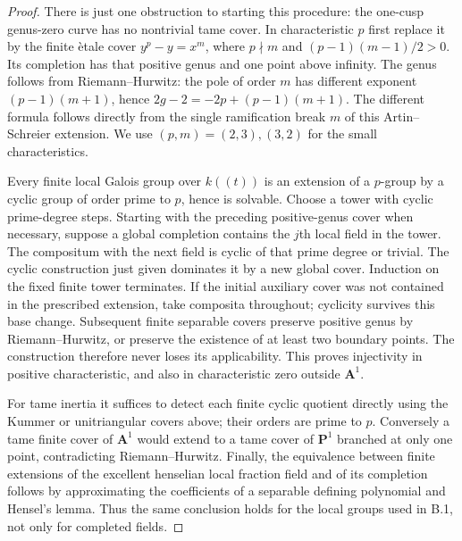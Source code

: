 \begin{proof}
There is just one obstruction to starting this procedure:
the one-cusp genus-zero curve has no nontrivial tame cover. In
characteristic $p$ first replace it by the finite \`etale cover
$y^p-y=x^m$, where $p\nmid m$ and
$(p-1)(m-1)/2>0$. Its completion has that positive genus and one
point above infinity. The genus follows from Riemann--Hurwitz:
the pole of order $m$ has different exponent $(p-1)(m+1)$, hence
$2g-2=-2p+(p-1)(m+1)$. The different formula follows directly
from the single ramification break $m$ of this Artin--Schreier
extension. We use $(p,m)=(2,3),(3,2)$ for the small characteristics.

Every finite local Galois group over $k((t))$ is an extension of
a $p$-group by a cyclic group of order prime to $p$, hence is
solvable. Choose a tower with cyclic prime-degree steps. Starting
with the preceding positive-genus cover when necessary, suppose
a global completion contains the $j$th local field in the tower.
The compositum with the next field is cyclic of that prime degree
or trivial. The cyclic construction just given dominates it by a
new global cover. Induction on the fixed finite tower terminates.
If the initial auxiliary cover was not contained in the prescribed
extension, take composita throughout; cyclicity survives this base
change. Subsequent finite separable covers preserve positive genus
by Riemann--Hurwitz, or preserve the existence of at least two
boundary points. The construction therefore never loses its
applicability. This proves injectivity in positive characteristic,
and also in characteristic zero outside $\mathbf A^1$.

For tame inertia it suffices to detect each finite cyclic quotient
directly using the Kummer or unitriangular covers above; their
orders are prime to $p$. Conversely a tame finite cover of
$\mathbf A^1$ would extend to a tame cover of $\mathbf P^1$
branched at only one point, contradicting Riemann--Hurwitz.
Finally, the equivalence between finite extensions of the excellent
henselian local fraction field and of its completion follows by
approximating the coefficients of a separable defining polynomial
and Hensel's lemma. Thus the same conclusion holds for the local
groups used in B.1, not only for completed fields.
\end{proof}

